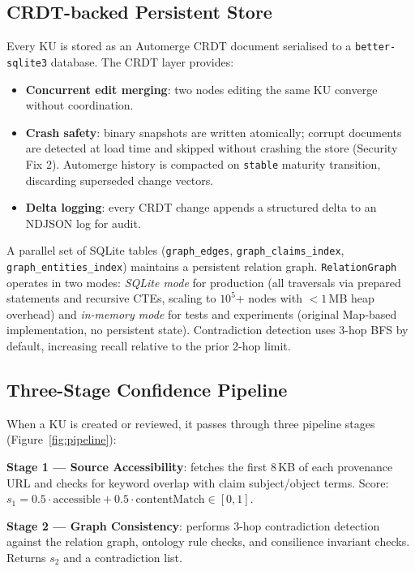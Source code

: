 \documentclass[10pt,twocolumn]{article}
\begin{document}
\subsection{CRDT-backed Persistent Store}

Every KU is stored as an Automerge CRDT document serialised to a
\texttt{better-sqlite3} database. The CRDT layer provides:

\begin{itemize}[noitemsep,topsep=2pt]
  \item \textbf{Concurrent edit merging}: two nodes editing the same KU
        converge without coordination.
  \item \textbf{Crash safety}: binary snapshots are written atomically; corrupt
        documents are detected at load time and skipped without crashing the
        store (Security Fix 2). Automerge history is compacted on
        \texttt{stable} maturity transition, discarding superseded change
        vectors.
  \item \textbf{Delta logging}: every CRDT change appends a structured delta to
        an NDJSON log for audit.
\end{itemize}

A parallel set of SQLite tables (\texttt{graph\_edges},
\texttt{graph\_claims\_index}, \texttt{graph\_entities\_index}) maintains a
persistent relation graph. \texttt{RelationGraph} operates in two modes:
\emph{SQLite mode} for production (all traversals via prepared statements and
recursive CTEs, scaling to $10^5$+ nodes with $<1$\,MB heap overhead) and
\emph{in-memory mode} for tests and experiments (original Map-based
implementation, no persistent state). Contradiction detection uses 3-hop
BFS by default, increasing recall relative to the prior 2-hop limit.

\subsection{Three-Stage Confidence Pipeline}

When a KU is created or reviewed, it passes through three pipeline stages
(Figure~\ref{fig:pipeline}):

\textbf{Stage 1 — Source Accessibility}: fetches the first 8\,KB of each
provenance URL and checks for keyword overlap with claim subject/object terms.
Score: $s_1 = 0.5 \cdot \text{accessible} + 0.5 \cdot \text{contentMatch}
\in [0,1]$.

\textbf{Stage 2 — Graph Consistency}: performs 3-hop contradiction detection
against the relation graph, ontology rule checks, and consilience invariant
checks. Returns $s_2$ and a contradiction list.
\end{document}

